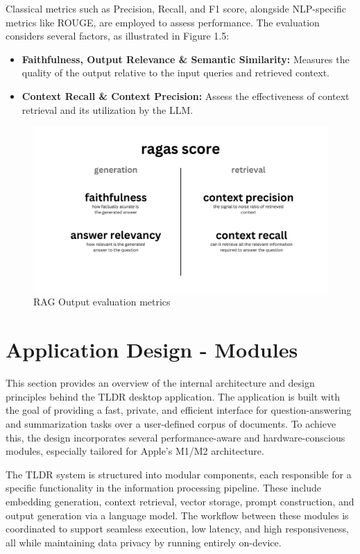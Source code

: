 Classical metrics such as Precision, Recall, and F1 score, alongside NLP-specific metrics like ROUGE, are employed to assess performance. The evaluation considers several factors, as illustrated in Figure 1.5:
\begin{itemize}
    \item \textbf{Faithfulness, Output Relevance \& Semantic Similarity:} Measures the quality of the output relative to the input queries and retrieved context.
    \item \textbf{Context Recall \& Context Precision:} Assess the effectiveness of context retrieval and its utilization by the LLM.
\end{itemize}
\begin{figure}[H]
    \centering
    \includegraphics[width=0.56\linewidth]{images/rag-eval.png}
    \caption{RAG Output evaluation metrics ~\cite{cardenas2023rag}}
    \label{fig:autoregressive_decoding}
\end{figure}



\section{Application Design - Modules}
\label{sec:ApplicationDesign-Modules}

This section provides an overview of the internal architecture and design principles behind the TLDR desktop application. The application is built with the goal of providing a fast, private, and efficient interface for question-answering and summarization tasks over a user-defined corpus of documents. To achieve this, the design incorporates several performance-aware and hardware-conscious modules, especially tailored for Apple’s M1/M2 architecture.

The TLDR system is structured into modular components, each responsible for a specific functionality in the information processing pipeline. These include embedding generation, context retrieval, vector storage, prompt construction, and output generation via a language model. The workflow between these modules is coordinated to support seamless execution, low latency, and high responsiveness, all while maintaining data privacy by running entirely on-device.


